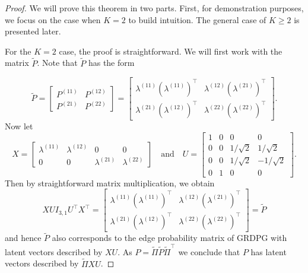 \documentclass[
  12pt,
]{article}
\theoremstyle{definition}
\theoremstyle{definition}
\theoremstyle{definition}
\theoremstyle{definition}
\theoremstyle{remark}
\begin{document}
\begin{proof}
We will prove this theorem in two parts. First, for demonstration
purposes, we focus on the case when $K = 2$ to build intuition. 
The general case of $K \geq 2$ is presented later.  

For the $K = 2$ case, the proof is straightforward. We will first work with
the matrix $\tilde{P}$. Note that $\tilde{P}$ has the form

$$\tilde{P} = \begin{bmatrix} P^{(11)} & P^{(12)} \\ P^{(21)} &
P^{(22)} \end{bmatrix} = \begin{bmatrix} \lambda^{(11)} (\lambda^{(11)})^\top & \lambda^{(12)} (\lambda^{(21)})^\top \\
\lambda^{(21)} (\lambda^{(12)})^\top & \lambda^{(22)}
(\lambda^{(22)})^\top \end{bmatrix}.$$
Now let
$$X = \begin{bmatrix}
\lambda^{(11)} & \lambda^{(12)} & 0 & 0 \\
0 & 0 & \lambda^{(21)} & \lambda^{(22)}
\end{bmatrix} \quad \text{and} \quad
U = \begin{bmatrix} 1 & 0 & 0 & 0 \\
0 & 0 & 1 / \sqrt{2} & 1 / \sqrt{2} \\
0 & 0 & 1 / \sqrt{2} & - 1 / \sqrt{2} \\
0 & 1 & 0 & 0 \end{bmatrix}.$$
Then by straightforward matrix multiplication, we obtain 
$$X U I_{3, 1} U^\top X^\top =
\begin{bmatrix}
\lambda^{(11)} (\lambda^{(11)})^\top & \lambda^{(12)} (\lambda^{(21)})^\top \\
\lambda^{(21)} (\lambda^{(12)})^\top & \lambda^{(22)} (\lambda^{(22)})^\top
\end{bmatrix} = \tilde{P}$$
and hence $\tilde{P}$ also corresponds to the edge probability matrix of GRDPG
with latent vectors described by $X U$. As $P = \tilde{\Pi} \tilde{P}
\tilde{\Pi}^{\top}$ we conclude that $P$ has latent vectors described
by $\tilde{\Pi} X U$. 


\end{proof}
\end{document}
